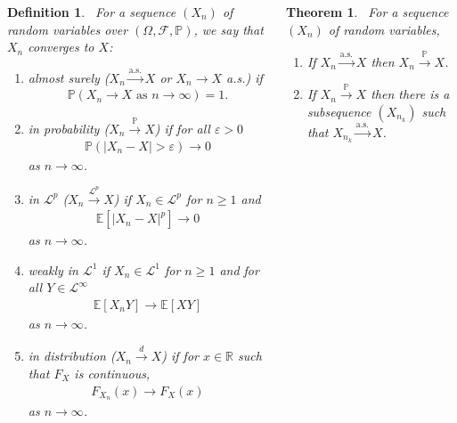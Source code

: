 \documentclass{tikzposter} %
\newtheorem{theorem}{Theorem}
\newtheorem{definition}{Definition}
\begin{document}
\begin{columns}
{    \begin{definition}
    \ For a sequence $(X_{n})$ of random variables over $(\Omega, \mathcal{F}, \mathbb{P})$, we say that $X_{n}$ converges to $X$:
    \begin{enumerate}[label=\roman*.]
            \item almost surely ($X_{n} \overset{\mathrm{a.s.}}{\to} X$ or $X_{n} \to X$ a.s.) if
            \begin{align*}
              \mathbb{P}(X_{n} \to X \text{ as } n \to \infty) = 1.
            \end{align*}
            \item in probability ($X_{n} \overset{\mathbb{P}}{\to} X$) if for all $\varepsilon > 0$
            \begin{align*}
              \mathbb{P}(|X_{n}-X| > \varepsilon) \to 0
            \end{align*}
            as $n \to \infty$.
      \item in $\mathcal{L}^{p}$ ($X_{n} \overset{\mathcal{L}^{p}}{\to} X$) if $X_{n} \in \mathcal{L}^{p}$ for $n \ge 1$ and
          \begin{align*}
            \mathbb{E}[|X_{n}-X|^{p}] \to 0
          \end{align*}
            as $n \to \infty$.
      \item weakly in $\mathcal{L}^{1}$ if $X_{n} \in \mathcal{L}^{1}$ for $n \ge 1$ and for all $Y \in \mathcal{L}^{\infty}$
            \begin{align*}
              \mathbb{E}[X_{n}Y] \to \mathbb{E}[XY]
            \end{align*}
            as $n \to \infty$.
            \item in distribution ($X_{n} \overset{d}{\to} X$) if for $x \in \mathbb{R}$ such that $F_{X}$ is continuous,
            \begin{align*}
              F_{X_{n}}(x) \to F_{X}(x)
            \end{align*}
            as $n \to \infty$.
    \end{enumerate}
    \end{definition}
    \hphantom{}


    \begin{theorem}
      \ For a sequence $(X_{n})$ of random variables,
      \begin{enumerate}[label=\roman*.]
              \item If $X_{n} \overset{\mathrm{a.s.}}{\to} X$ then $X_{n} \overset{\mathbb{P}}{\to} X$.
              \item If $X_{n} \overset{\mathbb{P}}{\to} X$ then there is a subsequence $(X_{n_{k}})$ such that $X_{n_{k}} \overset{\mathrm{a.s.}}{\to} X$.
      \end{enumerate}
    \end{theorem}
    \hphantom{}

}
\end{columns}
\end{document}
